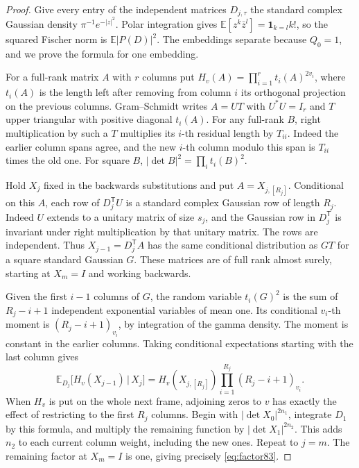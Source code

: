 \documentclass[a4paper,11pt]{article}
\theoremstyle{definition}
\theoremstyle{remark}
\numberwithin{equation}{section}
\begin{document}
\begin{proof}
Give every entry of the independent matrices \(D_{j,\tau}\) the
standard complex Gaussian density \(\pi^{-1}e^{-|z|^2}\).
Polar integration gives
\(\mathbb E[z^k\bar z^l]=\mathbf1_{k=l}k!\), so the squared
Fischer norm is \(\mathbb E|P(D)|^2\). The embeddings separate
because \(Q_0=1\), and we prove the formula for one embedding.

For a full-rank matrix \(A\) with \(r\) columns put
\(H_v(A)=\prod_{i=1}^r t_i(A)^{2v_i}\), where \(t_i(A)\)
is the length left after removing from column \(i\) its orthogonal
projection on the previous columns. Gram--Schmidt writes \(A=UT\)
with \(U^*U=I_r\) and \(T\) upper triangular with positive
diagonal \(t_i(A)\). For any full-rank \(B\), right multiplication
by such a \(T\) multiplies its \(i\)-th residual length by \(T_{ii}\).
Indeed the earlier column spans agree, and the new \(i\)-th column
modulo this span is \(T_{ii}\) times the old one. For square \(B\),
\(|\det B|^2=\prod_i t_i(B)^2\).

Hold \(X_j\) fixed in the backwards substitutions and put
\(A=X_{j,[R_j]}\). Conditional on this \(A\), each row of
\(D_j^{\mathsf T}U\) is a standard complex Gaussian row of length
\(R_j\). Indeed \(U\) extends to a unitary matrix of size \(s_j\),
and the Gaussian row in \(D_j^{\mathsf T}\) is invariant under
right multiplication by that unitary matrix. The rows are independent.
Thus \(X_{j-1}=D_j^{\mathsf T}A\) has the same conditional
distribution as \(GT\) for a square standard Gaussian \(G\).
These matrices are of full rank almost surely, starting at \(X_m=I\)
and working backwards.

Given the first \(i-1\) columns of \(G\), the random variable
\(t_i(G)^2\) is the sum of \(R_j-i+1\) independent exponential
variables of mean one. Its conditional \(v_i\)-th moment is
\((R_j-i+1)_{v_i}\), by integration of the gamma density.
The moment is constant in the earlier columns. Taking conditional
expectations starting with the last column gives
\[
 \mathbb E_{D_j}\bigl[H_v(X_{j-1})\,\big|\,X_j\bigr]
        = H_v(X_{j,[R_j]})\prod_{i=1}^{R_j}(R_j-i+1)_{v_i}.
\]
When \(H_v\) is put on the whole next frame, adjoining zeros to
\(v\) has exactly the effect of restricting to the first \(R_j\)
columns. Begin with \(|\det X_0|^{2n_1}\), integrate \(D_1\)
by this formula, and multiply the remaining function by
\(|\det X_1|^{2n_2}\). This adds \(n_2\) to each current column
weight, including the new ones. Repeat to \(j=m\). The remaining
factor at \(X_m=I\) is one, giving precisely \eqref{eq:factor83}.
\end{proof}
\end{document}
